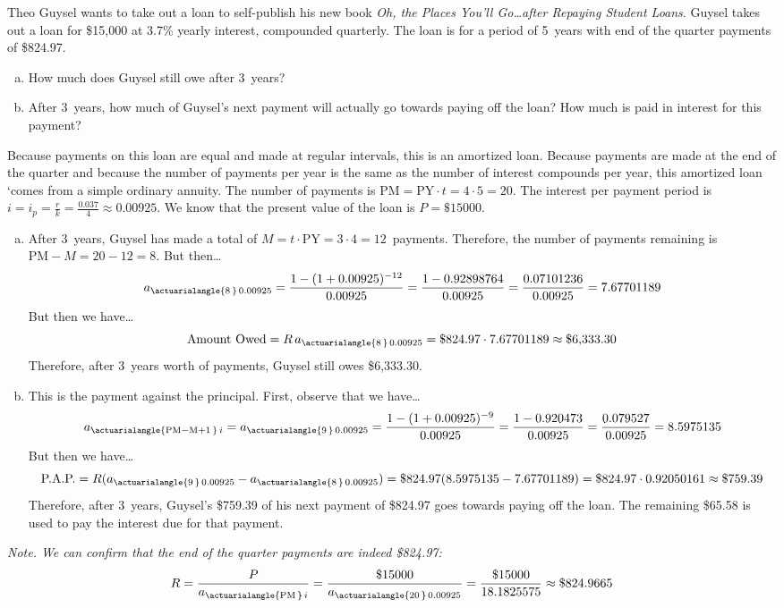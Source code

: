 \documentclass[11pt,letterpaper]{article}
\begin{document}
\newpage



 Theo Guysel wants to take out a loan to self-publish his new book \textit{Oh, the Places You'll Go\dots after Repaying Student Loans}. Guysel takes out a loan for \$15,000 at 3.7\% yearly interest, compounded quarterly. The loan is for a period of 5~years with end of the quarter payments of \$824.97.
	\begin{enumerate}[(a)]
	\item How much does Guysel still owe after 3~years?
	\item After 3~years, how much of Guysel's next payment will actually go towards paying off the loan? How much is paid in interest for this payment?
	\end{enumerate} \pspace

\sol Because payments on this loan are equal and made at regular intervals, this is an amortized loan. Because payments are made at the end of the quarter and because the number of payments per year is the same as the number of interest compounds per year, this amortized loan `comes from a simple ordinary annuity. The number of payments is $\text{PM}= \text{PY} \cdot t= 4 \cdot 5= 20$. The interest per payment period is $i= i_p= \frac{r}{k}= \frac{0.037}{4} \approx 0.00925$. We know that the present value of the loan is $P= \$15000$. 
 
\begin{enumerate}[(a)]
\item After 3~years, Guysel has made a total of $M= t \cdot \text{PY}= 3 \cdot 4= 12$~payments. Therefore, the number of payments remaining is $\text{PM} - M= 20 - 12= 8$. But then\dots
	\[
	\begin{aligned}
	a_{\actuarialangle{8\,}\, 0.00925}= \dfrac{1 - (1 + 0.00925)^{-12}}{0.00925}= \dfrac{1 - 0.92898764}{0.00925}= \dfrac{0.07101236}{0.00925}= 7.67701189
	\end{aligned}
	\]
But then we have\dots
	\[
	\text{Amount Owed}= R\, a_{\actuarialangle{8\,}\, 0.00925}= \$824.97 \cdot 7.67701189 \approx \$6,\!333.30
	\] 
Therefore, after 3~years worth of payments, Guysel still owes \$6,333.30. \pspace

\item This is the payment against the principal. First, observe that we have\dots
	\[
	a_{\actuarialangle{\text{PM} - \text{M} + 1\,}\, i}= a_{\actuarialangle{9\,}\, 0.00925}= \dfrac{1 - (1 + 0.00925)^{-9}}{0.00925}= \dfrac{1 - 0.920473}{0.00925}= \dfrac{0.079527}{0.00925}= 8.5975135
	\]
But then we have\dots
	\[
	\text{P.A.P.}= R ( a_{\actuarialangle{9\,}\, 0.00925} - a_{\actuarialangle{8\,}\, 0.00925})= \$824.97 (8.5975135 - 7.67701189)= \$824.97 \cdot 0.92050161 \approx \$759.39
	\]
Therefore, after 3~years, Guysel's \$759.39 of his next payment of \$824.97 goes towards paying off the loan. The remaining \$65.58 is used to pay the interest due for that payment. 
\end{enumerate}

\vfill

{\itshape Note. We can confirm that the end of the quarter payments are indeed \$824.97:
	\[
	R= \dfrac{P}{a_{\actuarialangle{\text{PM}\,}\, i}}= \dfrac{\$15000}{a_{\actuarialangle{20\,}\, 0.00925}}= \dfrac{\$15000}{18.1825575} \approx \$824.9665
	\]
}
\end{document}
